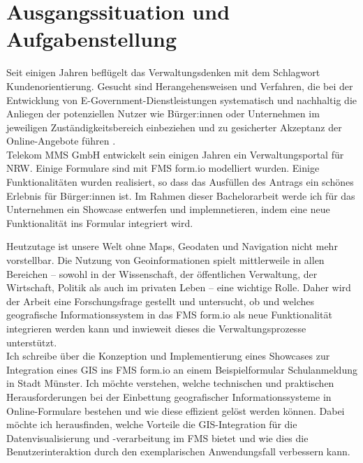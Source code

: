 \section{Ausgangssituation und Aufgabenstellung}


Seit einigen Jahren beflügelt das Verwaltungsdenken mit dem Schlagwort Kundenorientierung. Gesucht sind Herangehensweisen und Verfahren, die bei der Entwicklung von E-Government-Dienstleistungen systematisch und nachhaltig die Anliegen der potenziellen Nutzer wie Bürger:innen oder Unternehmen im jeweiligen Zuständigkeitsbereich einbeziehen und zu gesicherter Akzeptanz der Online-Angebote führen \citep{bleek_steuerungsmodell_2005}.\\


Telekom MMS GmbH entwickelt sein einigen Jahren ein Verwaltungsportal für NRW. Einige Formulare sind mit FMS form.io modelliert wurden. Einige Funktionalitäten wurden realisiert, so dass das Ausfüllen des Antrags ein schönes Erlebnis für Bürger:innen ist. Im Rahmen dieser Bachelorarbeit werde ich für das Unternehmen ein Showcase entwerfen und implemnetieren, indem eine neue Funktionalität ins Formular integriert wird.

Heutzutage ist unsere Welt ohne Maps, Geodaten und Navigation nicht mehr vorstellbar. Die Nutzung von Geoinformationen spielt mittlerweile in allen Bereichen – sowohl in der Wissenschaft, der öffentlichen Verwaltung, der Wirtschaft, Politik als auch im privaten Leben – eine wichtige Rolle. Daher wird der Arbeit eine Forschungsfrage gestellt und untersucht, ob und welches geografische Informationssystem in das FMS form.io als neue Funktionalität integrieren werden kann und inwieweit dieses die Verwaltungsprozesse unterstützt.\\


Ich schreibe über die Konzeption und Implementierung eines Showcases zur Integration eines GIS ins FMS form.io an einem Beispielformular Schulanmeldung in Stadt Münster. Ich möchte verstehen, welche technischen und praktischen Herausforderungen bei der Einbettung geografischer Informationssysteme in Online-Formulare bestehen und wie diese effizient gelöst werden können. Dabei möchte ich herausfinden, welche Vorteile die GIS-Integration für die Datenvisualisierung und -verarbeitung im FMS bietet und wie dies die Benutzerinteraktion durch den exemplarischen Anwendungsfall verbessern kann.




